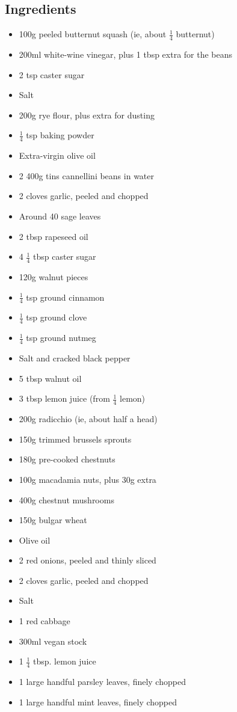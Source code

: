 \documentclass{book}
\begin{document}
\subsection*{Ingredients}
\begin{itemize}
\item 100g peeled butternut squash (ie, about $\frac{1}{4}$ butternut) 
\item 200ml white-wine vinegar, plus 1 tbsp extra for the beans 
\item 2 tsp caster sugar 
\item Salt
\item 200g rye flour, plus extra for dusting
\item $\frac{1}{4}$ tsp baking powder
\item Extra-virgin olive oil 
\item 2 400g tins cannellini beans in water
\item 2 cloves garlic, peeled and chopped 
\item Around 40 sage leaves
\end{itemize}

\begin{itemize}
\item 2 tbsp rapeseed oil 
\item 4 $\frac{1}{4}$ tbsp caster sugar
\item 120g walnut pieces
\item $\frac{1}{4}$ tsp ground cinnamon 
\item $\frac{1}{4}$ tsp ground clove
\item $\frac{1}{4}$ tsp ground nutmeg
\item Salt and cracked black pepper 
\item 5 tbsp walnut oil 
\item 3 tbsp lemon juice (from $\frac{1}{4}$ lemon) 
\item 200g radicchio (ie, about half a head)
\item 150g trimmed brussels sprouts 
\end{itemize}

\begin{itemize}
\item 180g pre-cooked chestnuts
\item 100g macadamia nuts, plus 30g extra
\item 400g chestnut mushrooms 
\item 150g bulgar wheat
\item Olive oil 
\item 2 red onions, peeled and thinly sliced 
\item 2 cloves garlic, peeled and chopped 
\item Salt 
\item 1 red cabbage
\item 300ml vegan stock
\item 1 $\frac{1}{4}$ tbsp. lemon juice
\item 1 large handful parsley leaves, finely chopped 
\item 1 large handful mint leaves, finely chopped 
\end{itemize}
\end{document}
